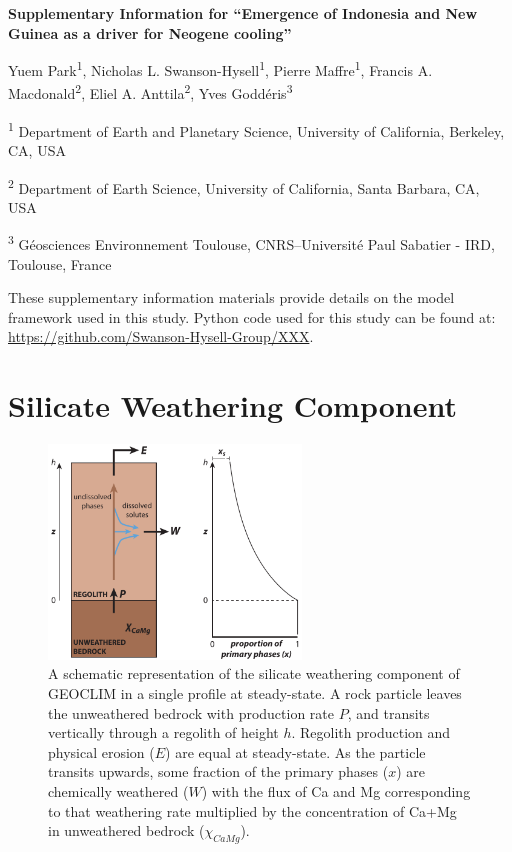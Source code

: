 \documentclass[11pt,letterpaper]{article}
\begin{document}
\begin{flushleft}
{\Large \textbf{Supplementary Information for ``Emergence of Indonesia and New Guinea as a driver for Neogene cooling''}}

Yuem Park\textsuperscript{1},
Nicholas L. Swanson-Hysell\textsuperscript{1},
Pierre Maffre\textsuperscript{1},
Francis A. Macdonald\textsuperscript{2},
Eliel A. Anttila\textsuperscript{2},
Yves Godd\'eris\textsuperscript{3}

\bigskip
\textsuperscript{1} Department of Earth and Planetary Science, University of California, Berkeley, CA, USA

\textsuperscript{2} Department of Earth Science, University of California, Santa Barbara, CA, USA

\textsuperscript{3} G\'eosciences Environnement Toulouse, CNRS--Universit\'e Paul Sabatier - IRD, Toulouse, France

\bigskip

\end{flushleft}

\linenumbers

These supplementary information materials provide details on the model framework used in this study. Python code used for this study can be found at: \url{https://github.com/Swanson-Hysell-Group/XXX}.

\section*{Silicate Weathering Component}

\begin{figure}
\begin{center}
	\includegraphics[width=0.6\textwidth]{../Figures/regolith_schematic.pdf}
	\caption{A schematic representation of the silicate weathering component of GEOCLIM in a single profile at steady-state. A rock particle leaves the unweathered bedrock with production rate $P$, and transits vertically through a regolith of height $h$. Regolith production and physical erosion ($E$) are equal at steady-state. As the particle transits upwards, some fraction of the primary phases ($x$) are chemically weathered ($W$) with the flux of Ca and Mg corresponding to that weathering rate multiplied by the concentration of Ca+Mg in unweathered bedrock ($\chi_{CaMg}$).}
	\label{fig:regolith_schematic}
\end{center}
\end{figure}
\end{document}
